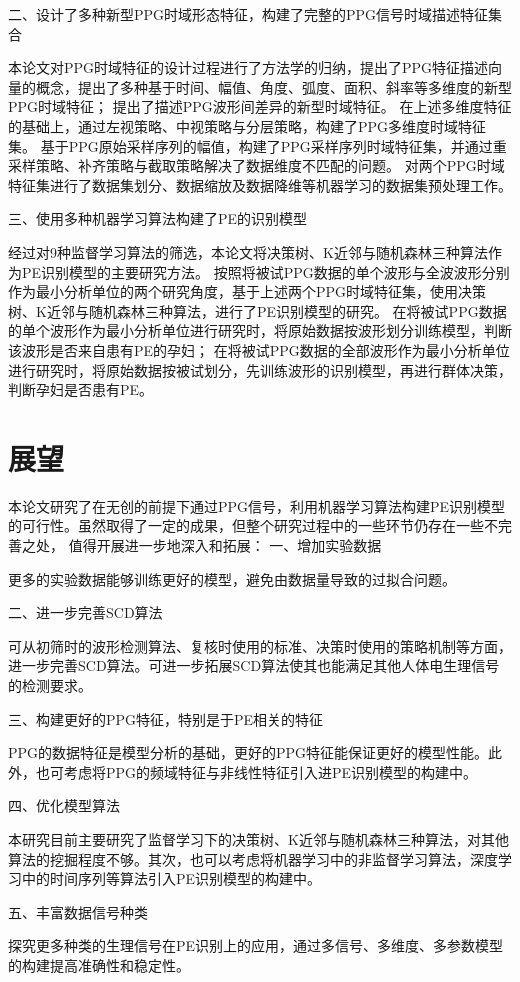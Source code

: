 二、设计了多种新型PPG时域形态特征，构建了完整的PPG信号时域描述特征集合

本论文对PPG时域特征的设计过程进行了方法学的归纳，提出了PPG特征描述向量的概念，提出了多种基于时间、幅值、角度、弧度、面积、斜率等多维度的新型PPG时域特征；
提出了描述PPG波形间差异的新型时域特征。
在上述多维度特征的基础上，通过左视策略、中视策略与分层策略，构建了PPG多维度时域特征集。
基于PPG原始采样序列的幅值，构建了PPG采样序列时域特征集，并通过重采样策略、补齐策略与截取策略解决了数据维度不匹配的问题。
对两个PPG时域特征集进行了数据集划分、数据缩放及数据降维等机器学习的数据集预处理工作。


三、使用多种机器学习算法构建了PE的识别模型

经过对9种监督学习算法的筛选，本论文将决策树、K近邻与随机森林三种算法作为PE识别模型的主要研究方法。
按照将被试PPG数据的单个波形与全波波形分别作为最小分析单位的两个研究角度，基于上述两个PPG时域特征集，使用决策树、K近邻与随机森林三种算法，进行了PE识别模型的研究。
在将被试PPG数据的单个波形作为最小分析单位进行研究时，将原始数据按波形划分训练模型，判断该波形是否来自患有PE的孕妇；
在将被试PPG数据的全部波形作为最小分析单位进行研究时，将原始数据按被试划分，先训练波形的识别模型，再进行群体决策，判断孕妇是否患有PE。

\section{展望}

本论文研究了在无创的前提下通过PPG信号，利用机器学习算法构建PE识别模型的可行性。虽然取得了一定的成果，但整个研究过程中的一些环节仍存在一些不完善之处，
值得开展进一步地深入和拓展：
一、增加实验数据

更多的实验数据能够训练更好的模型，避免由数据量导致的过拟合问题。

二、进一步完善SCD算法

可从初筛时的波形检测算法、复核时使用的标准、决策时使用的策略机制等方面，进一步完善SCD算法。可进一步拓展SCD算法使其也能满足其他人体电生理信号的检测要求。

三、构建更好的PPG特征，特别是于PE相关的特征

PPG的数据特征是模型分析的基础，更好的PPG特征能保证更好的模型性能。此外，也可考虑将PPG的频域特征与非线性特征引入进PE识别模型的构建中。

四、优化模型算法

本研究目前主要研究了监督学习下的决策树、K近邻与随机森林三种算法，对其他算法的挖掘程度不够。其次，也可以考虑将机器学习中的非监督学习算法，深度学习中的时间序列等算法引入PE识别模型的构建中。

五、丰富数据信号种类

探究更多种类的生理信号在PE识别上的应用，通过多信号、多维度、多参数模型的构建提高准确性和稳定性。
